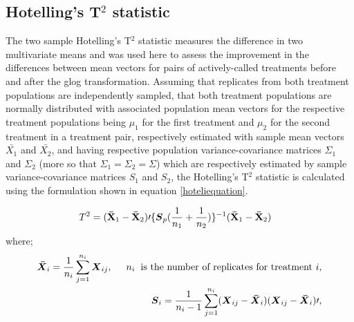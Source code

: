 \documentclass[11pt]{article}
\begin{document}
\subsection{Hotelling's T$^2$ statistic}\label{hoteli} %
\par{The two sample Hotelling's T$^2$ statistic \cite{hotelling1931,wichern2007} measures the difference in two multivariate means and was used here to assess the improvement in the differences between mean vectors for pairs of actively-called treatments before and after the glog transformation. Assuming that replicates from both treatment populations are independently sampled, that both treatment populations are normally distributed with associated population mean vectors for the respective treatment populations being $\mu_1$ for the first treatment and $\mu_2$ for the second treatment in a treatment pair, respectively estimated with sample mean vectors $\bar{X_1}$ and $\bar{X_2}$, and having respective population variance-covariance matrices $\Sigma_1$ and $\Sigma_2$ (more so  that $\Sigma_1= \Sigma_2=\Sigma$) which are respectively estimated by sample variance-covariance matrices $S_1$ and $S_2$, the Hotelling's T$^2$ statistic is calculated using the formulation shown in equation \ref{hoteliequation}.

\begin{equation}\label{hoteliequation}
\begin{split}
T^2 = (\mathbf{\bar{X}}_1-\mathbf{\bar{X}}_2)\prime \{\boldsymbol{S}_p(\frac{1}{n_1}+\frac{1}{n_2})\}^{-1}(\mathbf{\bar{X}}_1-\mathbf{\bar{X}}_2) \hspace{3mm}
\end{split}
\end{equation}
where; 
\begin{equation*}
\begin{split}
\boldsymbol{\bar{X}}_i= \frac{1}{n_i} \sum_{j=1}^{n_i}\boldsymbol{X}_{ij},  \hspace{5mm}
n_i \hspace{2mm} \mbox{is the number of replicates for treatment $i$}, \\  
\boldsymbol{S}_i=\frac{1}{n_i-1} \sum_{j=1}^{n_i}(\boldsymbol{X}_{ij}-\boldsymbol{\bar{X}}_i)(\boldsymbol{X}_{ij}-\boldsymbol{\bar{X}}_i)\prime, 
\end{split}
\end{equation*}

}
\end{document}
